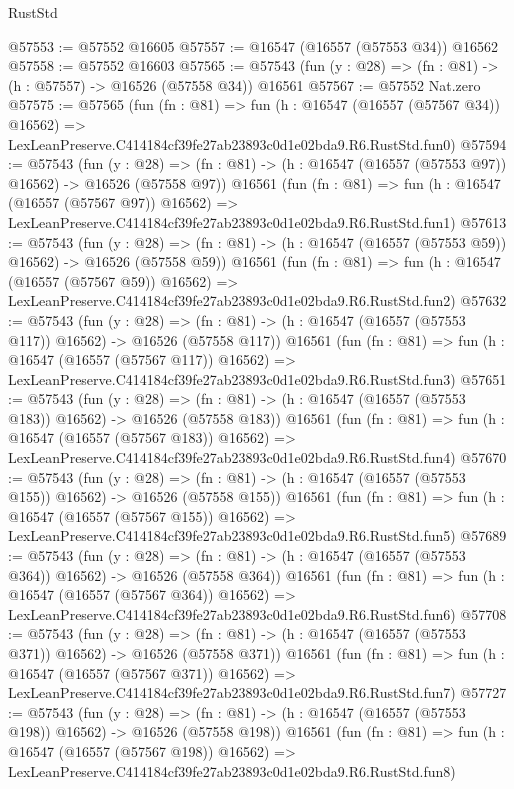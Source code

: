 \begin{lexlean}{RustStd}
\begin{coremodule}
@57553 := @57552 @16605
@57557 := @16547 (@16557 (@57553 @34)) @16562
@57558 := @57552 @16603
@57565 := @57543 (fun (y : @28) => (fn : @81) -> (h : @57557) -> @16526 (@57558 @34)) @16561
@57567 := @57552 Nat.zero
@57575 := @57565
    (fun (fn : @81) =>
    fun (h : @16547 (@16557 (@57567 @34)) @16562) =>
    LexLeanPreserve.C414184cf39fe27ab23893c0d1e02bda9.R6.RustStd.fun0)
@57594 := @57543
    (fun (y : @28) =>
    (fn : @81) -> (h : @16547 (@16557 (@57553 @97)) @16562) -> @16526 (@57558 @97))
    @16561
    (fun (fn : @81) =>
    fun (h : @16547 (@16557 (@57567 @97)) @16562) =>
    LexLeanPreserve.C414184cf39fe27ab23893c0d1e02bda9.R6.RustStd.fun1)
@57613 := @57543
    (fun (y : @28) =>
    (fn : @81) -> (h : @16547 (@16557 (@57553 @59)) @16562) -> @16526 (@57558 @59))
    @16561
    (fun (fn : @81) =>
    fun (h : @16547 (@16557 (@57567 @59)) @16562) =>
    LexLeanPreserve.C414184cf39fe27ab23893c0d1e02bda9.R6.RustStd.fun2)
@57632 := @57543
    (fun (y : @28) =>
    (fn : @81) -> (h : @16547 (@16557 (@57553 @117)) @16562) -> @16526 (@57558 @117))
    @16561
    (fun (fn : @81) =>
    fun (h : @16547 (@16557 (@57567 @117)) @16562) =>
    LexLeanPreserve.C414184cf39fe27ab23893c0d1e02bda9.R6.RustStd.fun3)
@57651 := @57543
    (fun (y : @28) =>
    (fn : @81) -> (h : @16547 (@16557 (@57553 @183)) @16562) -> @16526 (@57558 @183))
    @16561
    (fun (fn : @81) =>
    fun (h : @16547 (@16557 (@57567 @183)) @16562) =>
    LexLeanPreserve.C414184cf39fe27ab23893c0d1e02bda9.R6.RustStd.fun4)
@57670 := @57543
    (fun (y : @28) =>
    (fn : @81) -> (h : @16547 (@16557 (@57553 @155)) @16562) -> @16526 (@57558 @155))
    @16561
    (fun (fn : @81) =>
    fun (h : @16547 (@16557 (@57567 @155)) @16562) =>
    LexLeanPreserve.C414184cf39fe27ab23893c0d1e02bda9.R6.RustStd.fun5)
@57689 := @57543
    (fun (y : @28) =>
    (fn : @81) -> (h : @16547 (@16557 (@57553 @364)) @16562) -> @16526 (@57558 @364))
    @16561
    (fun (fn : @81) =>
    fun (h : @16547 (@16557 (@57567 @364)) @16562) =>
    LexLeanPreserve.C414184cf39fe27ab23893c0d1e02bda9.R6.RustStd.fun6)
@57708 := @57543
    (fun (y : @28) =>
    (fn : @81) -> (h : @16547 (@16557 (@57553 @371)) @16562) -> @16526 (@57558 @371))
    @16561
    (fun (fn : @81) =>
    fun (h : @16547 (@16557 (@57567 @371)) @16562) =>
    LexLeanPreserve.C414184cf39fe27ab23893c0d1e02bda9.R6.RustStd.fun7)
@57727 := @57543
    (fun (y : @28) =>
    (fn : @81) -> (h : @16547 (@16557 (@57553 @198)) @16562) -> @16526 (@57558 @198))
    @16561
    (fun (fn : @81) =>
    fun (h : @16547 (@16557 (@57567 @198)) @16562) =>
    LexLeanPreserve.C414184cf39fe27ab23893c0d1e02bda9.R6.RustStd.fun8)

\end{coremodule}
\end{lexlean}
